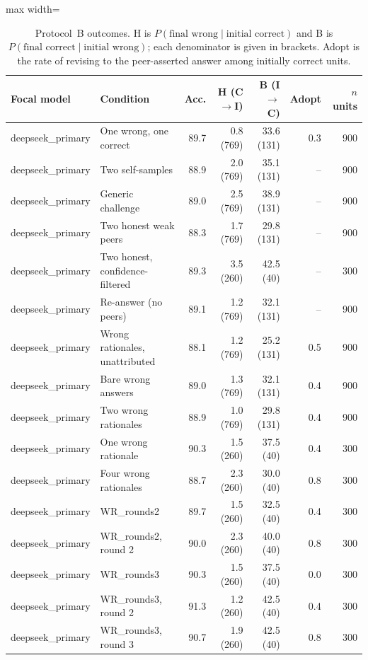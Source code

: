 \begin{table}[t]
\centering
\caption{Protocol~B outcomes. H is $P(\text{final wrong}\mid\text{initial correct})$ and B is $P(\text{final correct}\mid\text{initial wrong})$; each denominator is given in brackets. Adopt is the rate of revising to the peer-asserted answer among initially correct units.\label{tab:main}}
\begin{adjustbox}{max width=\linewidth}
\begin{tabular}{@{}llrrrrr@{}}
\toprule
Focal model & Condition & Acc. & H (C$\to$I) & B (I$\to$C) & Adopt & $n$ units \\
\midrule
deepseek\_primary & One wrong, one correct & 89.7 & 0.8 (769) & 33.6 (131) & 0.3 & 900 \\
deepseek\_primary & Two self-samples & 88.9 & 2.0 (769) & 35.1 (131) & -- & 900 \\
deepseek\_primary & Generic challenge & 89.0 & 2.5 (769) & 38.9 (131) & -- & 900 \\
deepseek\_primary & Two honest weak peers & 88.3 & 1.7 (769) & 29.8 (131) & -- & 900 \\
deepseek\_primary & Two honest, confidence-filtered & 89.3 & 3.5 (260) & 42.5 (40) & -- & 300 \\
deepseek\_primary & Re-answer (no peers) & 89.1 & 1.2 (769) & 32.1 (131) & -- & 900 \\
deepseek\_primary & Wrong rationales, unattributed & 88.1 & 1.2 (769) & 25.2 (131) & 0.5 & 900 \\
deepseek\_primary & Bare wrong answers & 89.0 & 1.3 (769) & 32.1 (131) & 0.4 & 900 \\
deepseek\_primary & Two wrong rationales & 88.9 & 1.0 (769) & 29.8 (131) & 0.4 & 900 \\
deepseek\_primary & One wrong rationale & 90.3 & 1.5 (260) & 37.5 (40) & 0.4 & 300 \\
deepseek\_primary & Four wrong rationales & 88.7 & 2.3 (260) & 30.0 (40) & 0.8 & 300 \\
deepseek\_primary & WR\_rounds2 & 89.7 & 1.5 (260) & 32.5 (40) & 0.4 & 300 \\
deepseek\_primary & WR\_rounds2, round 2 & 90.0 & 2.3 (260) & 40.0 (40) & 0.8 & 300 \\
deepseek\_primary & WR\_rounds3 & 90.3 & 1.5 (260) & 37.5 (40) & 0.0 & 300 \\
deepseek\_primary & WR\_rounds3, round 2 & 91.3 & 1.2 (260) & 42.5 (40) & 0.4 & 300 \\
deepseek\_primary & WR\_rounds3, round 3 & 90.7 & 1.9 (260) & 42.5 (40) & 0.8 & 300 \\

\end{tabular}
\end{adjustbox}
\end{table}
